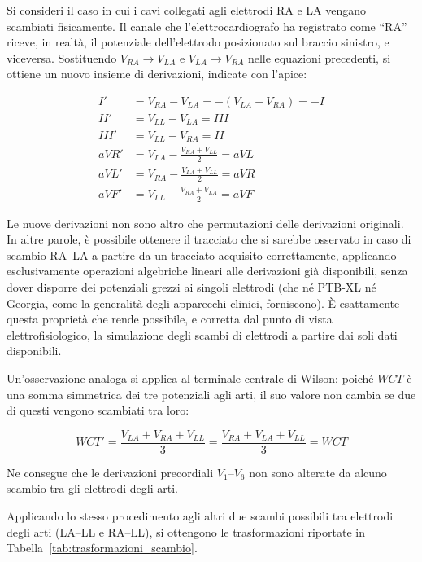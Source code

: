Si consideri il caso in cui i cavi collegati agli elettrodi RA e LA vengano scambiati fisicamente. Il canale che l'elettrocardiografo ha registrato come ``RA'' riceve, in realtà, il potenziale dell'elettrodo posizionato sul braccio sinistro, e viceversa. Sostituendo $V_{RA} \to V_{LA}$ e $V_{LA} \to V_{RA}$ nelle equazioni precedenti, si ottiene un nuovo insieme di derivazioni, indicate con l'apice:

\begin{align}
	I' &= V_{RA} - V_{LA} = -(V_{LA}-V_{RA}) = -I \\
	II' &= V_{LL} - V_{LA} = III \\
	III' &= V_{LL} - V_{RA} = II \\
	aVR' &= V_{LA} - \frac{V_{RA}+V_{LL}}{2} = aVL \\
	aVL' &= V_{RA} - \frac{V_{LA}+V_{LL}}{2} = aVR \\
	aVF' &= V_{LL} - \frac{V_{RA}+V_{LA}}{2} = aVF
\end{align}

Le nuove derivazioni non sono altro che permutazioni delle derivazioni originali. In altre parole, è possibile ottenere il tracciato che si sarebbe osservato in caso di scambio RA--LA a partire da un tracciato acquisito correttamente, applicando esclusivamente operazioni algebriche lineari alle derivazioni già disponibili, senza dover disporre dei potenziali grezzi ai singoli elettrodi (che né PTB-XL né Georgia, come la generalità degli apparecchi clinici, forniscono). È esattamente questa proprietà che rende possibile, e corretta dal punto di vista elettrofisiologico, la simulazione degli scambi di elettrodi a partire dai soli dati disponibili.

Un'osservazione analoga si applica al terminale centrale di Wilson: poiché $WCT$ è una somma simmetrica dei tre potenziali agli arti, il suo valore non cambia se due di questi vengono scambiati tra loro:

\begin{equation}
	WCT' = \frac{V_{LA} + V_{RA} + V_{LL}}{3} = \frac{V_{RA} + V_{LA} + V_{LL}}{3} = WCT
\end{equation}

Ne consegue che le derivazioni precordiali $V_1$--$V_6$ non sono alterate da alcuno scambio tra gli elettrodi degli arti.

Applicando lo stesso procedimento agli altri due scambi possibili tra elettrodi degli arti (LA--LL e RA--LL), si ottengono le trasformazioni riportate in Tabella~\ref{tab:trasformazioni_scambio}.

